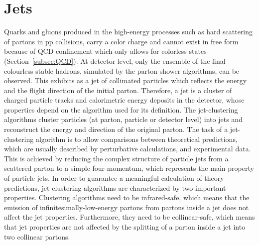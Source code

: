 \section{Jets}\label{sec:jets}

Quarks and gluons produced in the high-energy processes
such as hard scattering of partons in pp collisions, carry a color charge and 
cannot exist in free form because of QCD confinement which only allows for colorless states (Section~\ref{subsec:QCD}).
At detector level, only the ensemble of the final colourless stable hadrons, simulated by the parton shower algorithms, can be observed.
This exhibits as a jet of collimated particles which reflects the energy and the flight direction of the initial parton.
Therefore, a jet is a cluster of charged particle tracks and calorimetric energy deposits in the detector, whose properties depend on the algorithm used for its definition.
The jet-clustering algorithms cluster particles (at parton, particle or detector level) into jets and reconstruct the energy and direction of the original parton. The task of a jet-clustering algorithm is to allow comparisons between theoretical predictions, which are usually described by perturbative calculations, and experimental data. This is achieved by reducing the complex structure of particle jets from a scattered parton to a simple four-momentum, which represents the main property of particle jets.
In order to guarantee a meaningful calculation of theory predictions, jet-clustering algorithms are characterized by two important properties.
Clustering algorithms need to be infrared-safe, which means that the emission of infinitesimally-low-energy partons from partons inside a jet does not affect the jet properties. Furthermore, they need to be collinear-safe, which means that jet properties are not affected by the splitting of a parton inside a jet into two collinear partons.
